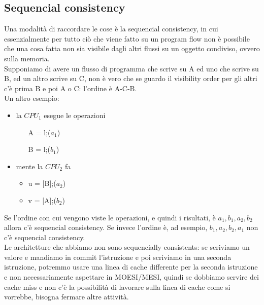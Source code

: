 \documentclass[12pt, oneside]{extbook}
\begin{document}
\subsection{Sequencial consistency}
Una modalità di raccordare le cose è la sequencial consistency, in cui essenzialmente per tutto ciò che viene fatto su un program flow non è possibile che una cosa fatta non sia visibile dagli altri flussi su un oggetto condiviso, ovvero sulla memoria.\\ Supponiamo di avere un flusso di programma che scrive su A ed uno che scrive su B, ed un altro scrive su C, non è vero che se guardo il visibility order per gli altri c'è prima B e poi A o C: l'ordine è A-C-B.\\ Un altro esempio:
\begin{itemize}
\item la $CPU_1$ esegue le operazioni
\begin{itemize}
\item [A] = l;($a_1$)
\item [B] = l;($b_1$)
\end{itemize}
\item mente la $CPU_2$ fa
\begin{itemize}
\item u = [B];($a_2$)
\item v = [A];($b_2$)
\end{itemize}
\end{itemize} 
Se l'ordine con cui vengono viste le operazioni, e quindi i risultati, è $a_1, b_1, a_2, b_2$ allora c'è sequencial consistency. Se invece l'ordine è, ad esempio, $b_1, a_2, b_2, a_1$ non c'è sequencial consistency.\\
Le architetture che abbiamo non sono sequencially consistents: se scriviamo un valore e mandiamo in commit l'istruzione e poi scriviamo in una seconda istruzione, potremmo usare una linea di cache differente per la seconda istruzione e non necessariamente aspettare in MOESI/MESI, quindi se dobbiamo servire dei cache miss e non c'è la possibilità di lavorare sulla linea di cache come si vorrebbe, bisogna fermare altre attività.
\end{document}
